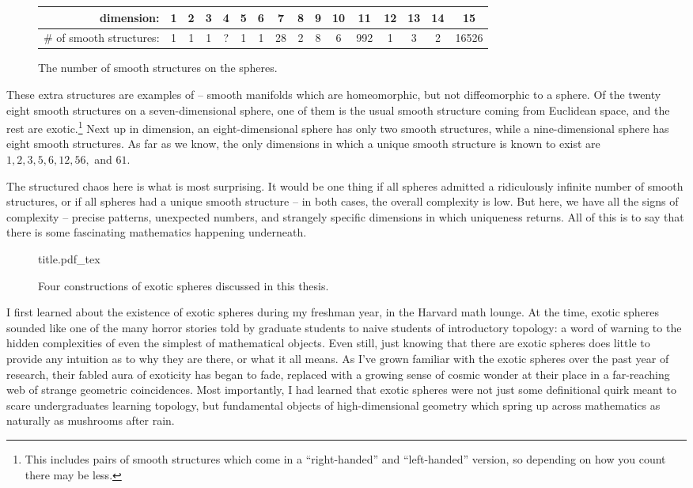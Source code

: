 \begin{figure}[ht]
	\renewcommand{\arraystretch}{1.2}
	\centering
	\begin{tabular}{r|c|c|c|c|c|c|c|c|c|c|c|c|c|c|c}
		\textrm{dimension:}               & 1 & 2 & 3 & 4 & 5 & 6 & 7  & 8 & 9 & 10 & 11  & 12 & 13 & 14 & 15    \\
		\hline
		\textrm{\# of smooth structures:} & 1 & 1 & 1 & ? & 1 & 1 & 28 & 2 & 8 & 6  & 992 & 1  & 3  & 2  & 16526 \\
	\end{tabular}
	\caption{The number of smooth structures on the spheres.}
\end{figure}

These extra structures are examples of  -- smooth manifolds which are homeomorphic, but not diffeomorphic to a sphere.
Of the twenty eight smooth structures on a seven-dimensional sphere, one of them is the usual smooth structure coming from Euclidean space, and the rest are exotic.\footnote{This includes pairs of smooth structures which come in a ``right-handed'' and ``left-handed'' version, so depending on how you count there may be less.} 
Next up in dimension, an eight-dimensional sphere has only two smooth structures, while a nine-dimensional sphere has eight smooth structures. 
As far as we know, the only dimensions in which a unique smooth structure is known to exist are $1,2,3,5,6,12,56,$ and $61$.

The structured chaos here is what is most surprising. 
It would be one thing if all spheres admitted a ridiculously infinite number of smooth structures, or if all spheres had a unique smooth structure -- in both cases, the overall complexity is low. 
But here, we have all the signs of complexity -- precise patterns, unexpected numbers, and strangely specific dimensions in which uniqueness returns. All of this is to say that there is some fascinating mathematics happening underneath.

\begin{figure}[ht]
	\centering
	{title.pdf_tex}
	\caption{Four constructions of exotic spheres discussed in this thesis.}
\end{figure}

\smallrule

I first learned about the existence of exotic spheres during my freshman year, in the Harvard math lounge. At the time, exotic spheres sounded like one of the many horror stories told by graduate students to naive students of introductory topology: a word of warning to the hidden complexities of even the simplest of mathematical objects. 
Even still, just knowing that there are exotic spheres does little to provide any intuition as to why they are there, or what it all means. 
As I've grown familiar with the exotic spheres over the past year of research, their fabled aura of exoticity has began to fade, replaced with a growing sense of cosmic wonder at their place in a far-reaching web of strange geometric coincidences.
Most importantly, I had learned that exotic spheres were not just some definitional quirk meant to scare undergraduates learning topology, 
but fundamental objects of high-dimensional geometry which spring up across mathematics as naturally as mushrooms after rain. 

